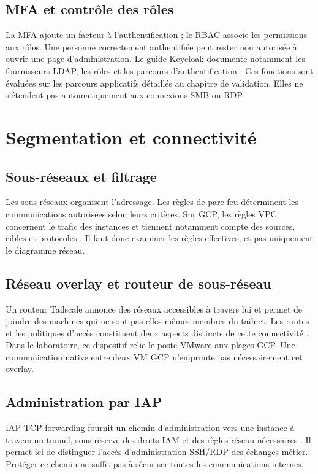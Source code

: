 \documentclass[a4paper,12pt]{report}
\begin{document}
\subsection{MFA et contrôle des rôles}
La MFA ajoute un facteur à l'authentification ; le RBAC associe les permissions aux rôles. Une personne correctement authentifiée peut rester non autorisée à ouvrir une page d'administration. Le guide Keycloak documente notamment les fournisseurs LDAP, les rôles et les parcours d'authentification \cite{keycloak}. Ces fonctions sont évaluées sur les parcours applicatifs détaillés au chapitre de validation. Elles ne s'étendent pas automatiquement aux connexions SMB ou RDP.

\section{Segmentation et connectivité}
\subsection{Sous-réseaux et filtrage}
Les sous-réseaux organisent l'adressage. Les règles de pare-feu déterminent les communications autorisées selon leurs critères. Sur GCP, les règles VPC concernent le trafic des instances et tiennent notamment compte des sources, cibles et protocoles \cite{gcpfirewall}. Il faut donc examiner les règles effectives, et pas uniquement le diagramme réseau.

\subsection{Réseau overlay et routeur de sous-réseau}
Un routeur Tailscale annonce des réseaux accessibles à travers lui et permet de joindre des machines qui ne sont pas elles-mêmes membres du tailnet. Les routes et les politiques d'accès constituent deux aspects distincts de cette connectivité \cite{tailscale}. Dans le laboratoire, ce dispositif relie le poste VMware aux plages GCP. Une communication native entre deux VM GCP n'emprunte pas nécessairement cet overlay.

\subsection{Administration par IAP}
IAP TCP forwarding fournit un chemin d'administration vers une instance à travers un tunnel, sous réserve des droits IAM et des règles réseau nécessaires \cite{iap}. Il permet ici de distinguer l'accès d'administration SSH/RDP des échanges métier. Protéger ce chemin ne suffit pas à sécuriser toutes les communications internes.
\end{document}
